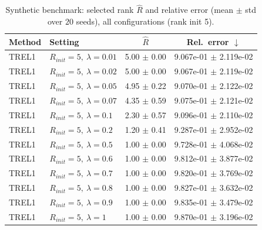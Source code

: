 \begin{table}[t]
\centering
\caption{Synthetic benchmark: selected rank \(\hat R\) and relative error (mean \(\pm\) std over \(20\) seeds), all configurations (rank init 5).}
\label{tab:results_synth_all}
\begin{tabular}{@{}llcc@{}}
\toprule
Method & Setting & \(\hat R\) & Rel.\ error \(\downarrow\) \\ \midrule
TREL1 & \(R_{init}=5,\ \lambda=0.01\) & 5.00 $\pm$ 0.00 & 9.067e-01 $\pm$ 2.119e-02 \\
TREL1 & \(R_{init}=5,\ \lambda=0.02\) & 5.00 $\pm$ 0.00 & 9.067e-01 $\pm$ 2.119e-02 \\
TREL1 & \(R_{init}=5,\ \lambda=0.05\) & 4.95 $\pm$ 0.22 & 9.070e-01 $\pm$ 2.122e-02 \\
TREL1 & \(R_{init}=5,\ \lambda=0.07\) & 4.35 $\pm$ 0.59 & 9.075e-01 $\pm$ 2.121e-02 \\
TREL1 & \(R_{init}=5,\ \lambda=0.1\) & 2.30 $\pm$ 0.57 & 9.096e-01 $\pm$ 2.110e-02 \\
TREL1 & \(R_{init}=5,\ \lambda=0.2\) & 1.20 $\pm$ 0.41 & 9.287e-01 $\pm$ 2.952e-02 \\
TREL1 & \(R_{init}=5,\ \lambda=0.5\) & 1.00 $\pm$ 0.00 & 9.728e-01 $\pm$ 4.068e-02 \\
TREL1 & \(R_{init}=5,\ \lambda=0.6\) & 1.00 $\pm$ 0.00 & 9.812e-01 $\pm$ 3.877e-02 \\
TREL1 & \(R_{init}=5,\ \lambda=0.7\) & 1.00 $\pm$ 0.00 & 9.820e-01 $\pm$ 3.769e-02 \\
TREL1 & \(R_{init}=5,\ \lambda=0.8\) & 1.00 $\pm$ 0.00 & 9.827e-01 $\pm$ 3.632e-02 \\
TREL1 & \(R_{init}=5,\ \lambda=0.9\) & 1.00 $\pm$ 0.00 & 9.835e-01 $\pm$ 3.479e-02 \\
TREL1 & \(R_{init}=5,\ \lambda=1\) & 1.00 $\pm$ 0.00 & 9.870e-01 $\pm$ 3.196e-02 \\
\bottomrule
\end{tabular}
\end{table}